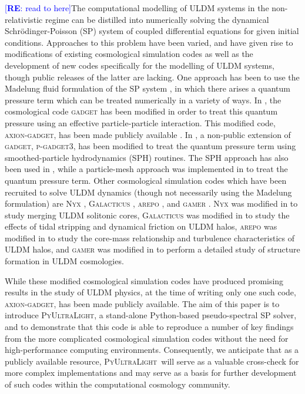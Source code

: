 \documentclass[a4paper,11pt]{article}
\newcommand{\PyUltraLight}{\textsc{PyUltraLight}\xspace}
\newcommand{\re}[1]{\textcolor{blue}{[{\bf RE}: #1]}}
\begin{document}
\re{read to here}The computational modelling of ULDM systems in the non-relativistic regime can be distilled into numerically solving the dynamical Schr{\"o}dinger-Poisson (SP) system of coupled differential equations for given initial conditions. Approaches to this problem have been varied, and have given rise to modifications of existing cosmological simulation codes as well as the development of new codes specifically for the modelling of ULDM systems, though public releases of the latter are  lacking. One approach has been to use the Madelung fluid formulation of the SP system \cite{Madelung1926}, in which there arises a quantum pressure term which can be treated numerically in a variety of ways. In \cite{Zhang2018}, the cosmological code \textsc{gadget} \cite{Springel2005} has been modified in order to treat this quantum pressure using an effective particle-particle interaction. This modified code, \textsc{axion-gadget}, has been made publicly available \cite{axion-gadget}. In \cite{Nori2018}, a non-public extension of \textsc{gadget}, \textsc{p-gadget3}, has been modified to treat the quantum pressure term using smoothed-particle hydrodynamics (SPH) routines. The SPH approach has also been used in \cite{Mocz2015}, while a particle-mesh approach was implemented in \cite{Veltmaat2016} to treat the quantum pressure term. Other cosmological simulation codes which have been recruited to solve ULDM dynamics (though not necessarily using the Madelung formulation) are N\textsc{yx} \cite{Almgren2013}, G\textsc{alacticus} \cite{Benson2012}, \textsc{arepo} \cite{Springel2010}, and \textsc{gamer} \cite{Schive2010, gamer}. N\textsc{yx} was modified in \cite{Schwabe2016} to study merging ULDM solitonic cores, G\textsc{alacticus} was modified in \cite{Du2017} to study the effects of tidal stripping and dynamical friction on ULDM halos, \textsc{arepo} was modified in \cite{Mocz2017} to study the core-mass relationship and turbulence characteristics of ULDM halos, and \textsc{gamer} was modified in \cite{Schive2014_b} to perform a detailed study of structure formation in ULDM cosmologies. 

While these modified cosmological simulation codes have produced promising results in the study of ULDM physics, at the time of writing only one such code, \textsc{axion-gadget}, has been made publicly available. The aim of this paper is to introduce \PyUltraLight, a stand-alone Python-based pseudo-spectral SP solver, and to demonstrate that this code is able to reproduce a number of key findings from the more complicated cosmological simulation codes without the need for high-performance computing environments. Consequently, we anticipate that as a publicly available resource, \PyUltraLight\ will serve as a valuable cross-check for more complex implementations and may serve as a basis for further development of such codes within the computational cosmology community.   
\end{document}
